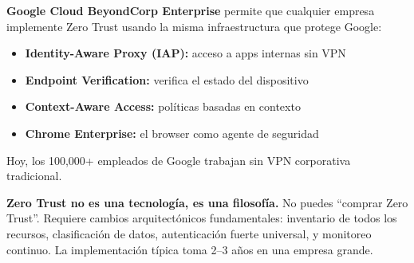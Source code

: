 \begin{moderno}
\textbf{ Google Cloud BeyondCorp Enterprise} permite que
cualquier empresa implemente Zero Trust usando la misma infraestructura
que protege Google:
\begin{itemize}
    \item \textbf{Identity-Aware Proxy (IAP):} acceso a apps internas sin VPN
    \item \textbf{Endpoint Verification:} verifica el estado del dispositivo
    \item \textbf{Context-Aware Access:} políticas basadas en contexto
    \item \textbf{Chrome Enterprise:} el browser como agente de seguridad
\end{itemize}
Hoy, los 100,000+ empleados de Google trabajan sin VPN corporativa tradicional.
\end{moderno}

\begin{cuidado}
\textbf{Zero Trust no es una tecnología, es una filosofía.} No puedes
``comprar Zero Trust''. Requiere cambios arquitectónicos fundamentales:
inventario de todos los recursos, clasificación de datos, autenticación
fuerte universal, y monitoreo continuo. La implementación típica toma
2--3 años en una empresa grande.
\end{cuidado}
